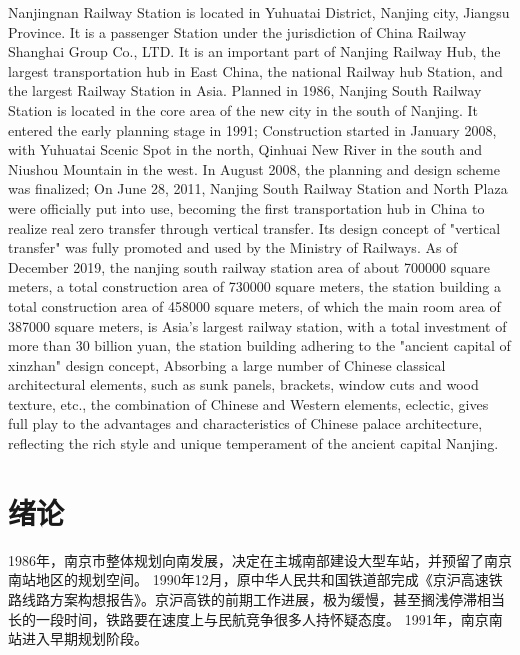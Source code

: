 \documentclass[bachelor]{njupthesis}
\begin{document}
\begin{englishabstract} %
Nanjingnan Railway Station is located in Yuhuatai District, Nanjing city, Jiangsu Province. It is a passenger Station under the jurisdiction of China Railway Shanghai Group Co., LTD. It is an important part of Nanjing Railway Hub, the largest transportation hub in East China, the national Railway hub Station, and the largest Railway Station in Asia.
Planned in 1986, Nanjing South Railway Station is located in the core area of the new city in the south of Nanjing. It entered the early planning stage in 1991; Construction started in January 2008, with Yuhuatai Scenic Spot in the north, Qinhuai New River in the south and Niushou Mountain in the west. In August 2008, the planning and design scheme was finalized; On June 28, 2011, Nanjing South Railway Station and North Plaza were officially put into use, becoming the first transportation hub in China to realize real zero transfer through vertical transfer. Its design concept of "vertical transfer" was fully promoted and used by the Ministry of Railways.
As of December 2019, the nanjing south railway station area of about 700000 square meters, a total construction area of 730000 square meters, the station building a total construction area of 458000 square meters, of which the main room area of 387000 square meters, is Asia's largest railway station, with a total investment of more than 30 billion yuan, the station building adhering to the "ancient capital of xinzhan" design concept, Absorbing a large number of Chinese classical architectural elements, such as sunk panels, brackets, window cuts and wood texture, etc., the combination of Chinese and Western elements, eclectic, gives full play to the advantages and characteristics of Chinese palace architecture, reflecting the rich style and unique temperament of the ancient capital Nanjing.

\end{englishabstract}

\thesistableofcontents %

\thesischapterexordium %

\chapter{绪论}
1986年，南京市整体规划向南发展，决定在主城南部建设大型车站，并预留了南京南站地区的规划空间。
1990年12月，原中华人民共和国铁道部完成《京沪高速铁路线路方案构想报告》。京沪高铁的前期工作进展，极为缓慢，甚至搁浅停滞相当长的一段时间，铁路要在速度上与民航竞争很多人持怀疑态度。
1991年，南京南站进入早期规划阶段。
\end{document}
